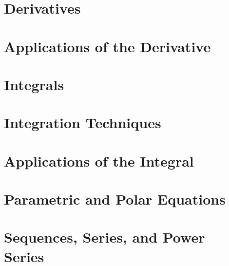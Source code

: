 \chapter{Derivatives}



\chapter{Applications of the Derivative}



\chapter{Integrals}



\chapter{Integration Techniques}



\chapter{Applications of the Integral}



\chapter{Parametric and Polar Equations}



\chapter{Sequences, Series, and Power Series}

